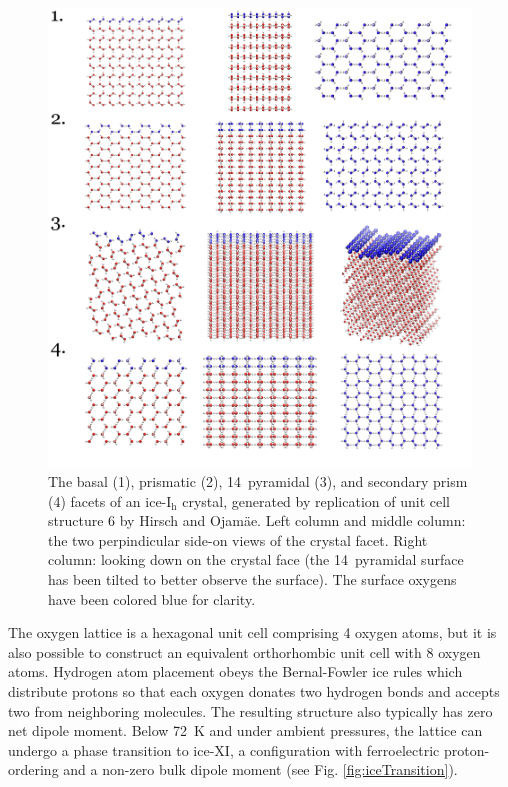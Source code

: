 \begin{figure} 
\includegraphics[width=1.0\linewidth]{Figures/surfMorph}
\caption{\label{fig:surfMorph}The basal (1), prismatic (2),
  14\degree~pyramidal (3), and secondary prism (4) facets of an
  ice-I$_\mathrm{h}$ crystal, generated by replication of unit cell
  structure 6 by Hirsch and Ojam\"{a}e. Left column and middle column:
  the two perpindicular side-on views of the crystal facet. Right
  column: looking down on the crystal face (the 14\degree~pyramidal
  surface has been tilted to better observe the surface). The surface oxygens have
  been colored blue for clarity.}
\end{figure}

The oxygen lattice is a hexagonal unit cell comprising 4 oxygen atoms,
but it is also possible to construct an equivalent orthorhombic unit
cell with 8 oxygen atoms.\cite{Hirsch2004} Hydrogen atom placement
obeys the Bernal-Fowler ice rules which distribute protons so that
each oxygen donates two hydrogen bonds and accepts two from
neighboring molecules.\cite{Bernal1933} The resulting structure also
typically has zero net dipole moment. Below 72~K and under ambient
pressures, the lattice can undergo a phase transition to ice-XI, a
configuration with ferroelectric proton-ordering and a non-zero bulk
dipole moment (see Fig. \ref{fig:iceTransition}).

